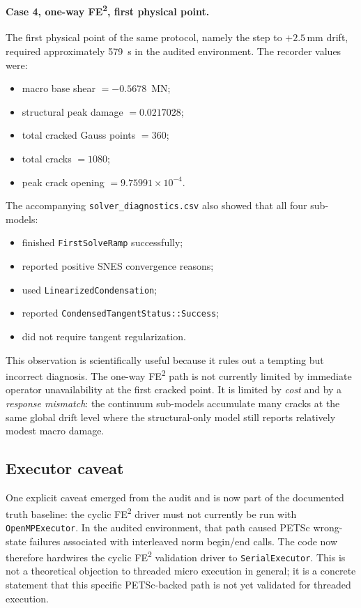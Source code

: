 \paragraph{Case 4, one-way FE\textsuperscript{2}, first physical point.}
The first physical point of the same protocol, namely the step to
\(+2.5\)\,mm drift, required approximately 579~s in the audited environment.
The recorder values were:
\begin{itemize}
  \item macro base shear \(= -0.5678\)~MN;
  \item structural peak damage \(= 0.0217028\);
  \item total cracked Gauss points \(= 360\);
  \item total cracks \(= 1080\);
  \item peak crack opening \(= 9.75991\times 10^{-4}\).
\end{itemize}
The accompanying \texttt{solver\_diagnostics.csv} also showed that all four
sub-models:
\begin{itemize}
  \item finished \texttt{FirstSolveRamp} successfully;
  \item reported positive SNES convergence reasons;
  \item used \texttt{LinearizedCondensation};
  \item reported \texttt{CondensedTangentStatus::Success};
  \item did not require tangent regularization.
\end{itemize}

This observation is scientifically useful because it rules out a tempting but
incorrect diagnosis.  The one-way FE\textsuperscript{2} path is not currently
limited by immediate operator unavailability at the first cracked point.  It is
limited by \emph{cost} and by a \emph{response mismatch}: the continuum
sub-models accumulate many cracks at the same global drift level where the
structural-only model still reports relatively modest macro damage.

\subsection{Executor caveat}

One explicit caveat emerged from the audit and is now part of the documented
truth baseline: the cyclic FE\textsuperscript{2} driver must not currently be
run with \texttt{OpenMPExecutor}.  In the audited environment, that path caused
PETSc wrong-state failures associated with interleaved norm begin/end calls.
The code now therefore hardwires the cyclic FE\textsuperscript{2} validation
driver to \texttt{SerialExecutor}.  This is not a theoretical objection to
threaded micro execution in general; it is a concrete statement that this
specific PETSc-backed path is not yet validated for threaded execution.

